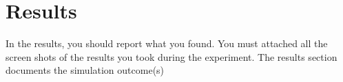 \section{Results}
In the results, you should report what you found. You must attached all the screen shots of the results you took during the experiment. The results section documents the simulation outcome(s)

